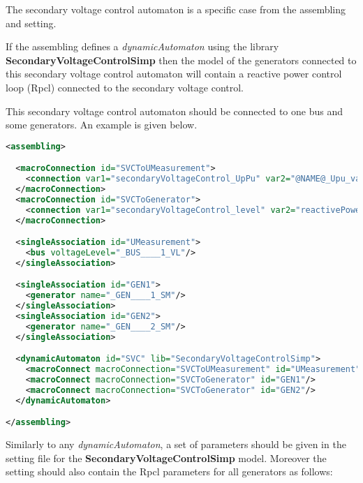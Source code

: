 \documentclass[a4paper, 12pt]{report}
\begin{document}
The secondary voltage control automaton is a specific case from the assembling and setting.

If the assembling defines a \textit{dynamicAutomaton} using the library \textbf{SecondaryVoltageControlSimp} then the model of the generators connected to
this secondary voltage control automaton will contain a reactive power control loop (Rpcl) connected to the secondary voltage control.

This secondary voltage control automaton should be connected to one bus and some generators.
An example is given below.

\begin{lstlisting}[language=XML, breaklines=true, breakatwhitespace=false, columns=fullflexible]
<assembling>

  <macroConnection id="SVCToUMeasurement">
    <connection var1="secondaryVoltageControl_UpPu" var2="@NAME@_Upu_value"/>
  </macroConnection>
  <macroConnection id="SVCToGenerator">
    <connection var1="secondaryVoltageControl_level" var2="reactivePowerControlLoop_level"/>
  </macroConnection>

  <singleAssociation id="UMeasurement">
    <bus voltageLevel="_BUS____1_VL"/>
  </singleAssociation>

  <singleAssociation id="GEN1">
    <generator name="_GEN____1_SM"/>
  </singleAssociation>
  <singleAssociation id="GEN2">
    <generator name="_GEN____2_SM"/>
  </singleAssociation>

  <dynamicAutomaton id="SVC" lib="SecondaryVoltageControlSimp">
    <macroConnect macroConnection="SVCToUMeasurement" id="UMeasurement"/>
    <macroConnect macroConnection="SVCToGenerator" id="GEN1"/>
    <macroConnect macroConnection="SVCToGenerator" id="GEN2"/>
  </dynamicAutomaton>

</assembling>
\end{lstlisting}


Similarly to any \textit{dynamicAutomaton}, a set of parameters should be given in the setting file for the \textbf{SecondaryVoltageControlSimp} model.
Moreover the setting should also contain the Rpcl parameters for all generators as follows:
\end{document}
